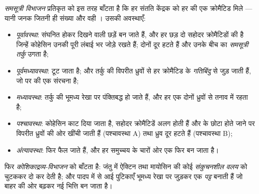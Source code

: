 \begin{definition}[समसूत्री विभाजन]\label{def:b1:replication-mitosis:mitosis}
\emph{समसूत्री विभाजन} प्रतिकृत  को इस तरह बाँटता है कि हर
संतति केंद्रक को हर  की एक क्रोमैटिड मिले --- यानी जनक जितनी ही
संख्या और वही । उसकी अवस्थाएँ:
\begin{itemize}
  \item \emph{पूर्वावस्था}:  संघनित होकर दिखने वाली छड़ें बन
        जाते हैं, और हर छड़ दो सहोदर क्रोमैटिडों की है जिन्हें कोहेसिन
         उनकी पूरी लंबाई भर जोड़े रखते हैं; दोनों
        \emph{} दूर हटते हैं और उनके बीच  का
        \emph{समसूत्री तर्कु} उगता है;
  \item \emph{पूर्वमध्यावस्था}:  टूट जाता है; और तर्कु की
         विपरीत ध्रुवों से हर क्रोमैटिड के
        \emph{गतिबिंदु} से जुड़ जाती हैं, जो  पर की एक
         संरचना है;
  \item \emph{मध्यावस्था}:  तर्कु की भूमध्य रेखा पर पंक्तिबद्ध
        हो जाते हैं, और हर एक दोनों ध्रुवों से तनाव में रहता है;
  \item \emph{पश्चावस्था}: कोहेसिन काट दिया जाता है, सहोदर क्रोमैटिडें
        अलग होती हैं और  के छोटा होते जाने पर विपरीत
        ध्रुवों की ओर खींची जाती हैं (पश्चावस्था A) तथा ध्रुव दूर हटते
        हैं (पश्चावस्था B);
  \item \emph{अंत्यावस्था}:  फिर फैल जाते हैं, और हर समुच्चय के
        चारों ओर एक  फिर बन जाता है।
\end{itemize}
फिर \emph{कोशिकाद्रव्य-विभाजन}  को बाँटता है: जंतु 
में ऐक्टिन तथा मायोसिन की कोई \emph{संकुचनशील वलय}  को चुटककर दो
कर देती है; और पादप  में  से आई पुटिकाएँ भूमध्य रेखा पर
जुड़कर एक \emph{ पट्ट} बनाती हैं जो बाहर की ओर बढ़कर नई भित्ति बन
जाता है।
\end{definition}

